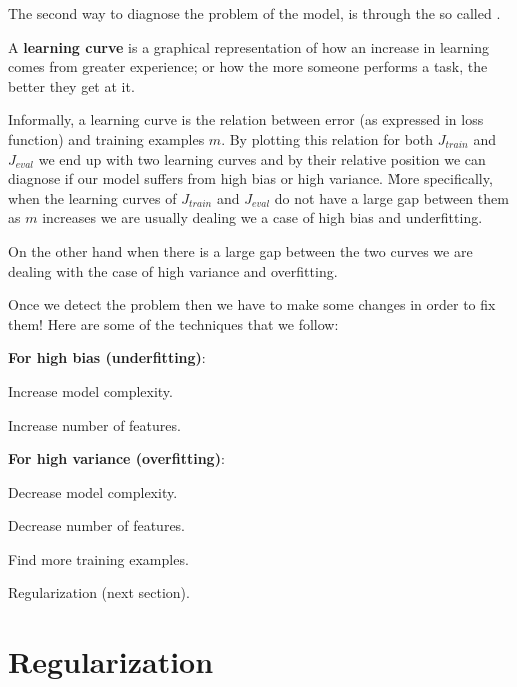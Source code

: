 The second way to diagnose the problem of the model, is through the so called .

A \textbf{learning curve} is a graphical representation of how an increase in learning comes from greater experience;
or how the more someone performs a task, the better they get at it.
\ed

Informally, a learning curve is the relation between error (as expressed in loss function) and training examples $m$.
By plotting this relation for both $J_{train}$ and $J_{eval}$ we end up with two learning curves and by their
relative position we can diagnose if our model suffers from high bias or high variance. \v

More specifically, when the learning curves of $J_{train}$ and $J_{eval}$ do not have a large gap between them as $m$
increases we are usually dealing we a case of high bias and underfitting.

\vspace{10pt}


\vspace{10pt}

On the other hand when there is a large gap between the two curves we are dealing with the case of high variance and
overfitting.

\vspace{10pt}


\vspace{10pt}

Once we detect the problem then we have to make some changes in order to fix them! Here are some of the techniques
that we follow:
\bit
\item \textbf{For high bias (underfitting)}:
\bit
\item Increase model complexity.
\item Increase number of features.
\eit
\item \textbf{For high variance (overfitting)}:
\bit
\item Decrease model complexity.
\item Decrease number of features.
\item Find more training examples.
\item Regularization (next section).
\eit
\eit

\section{Regularization}

